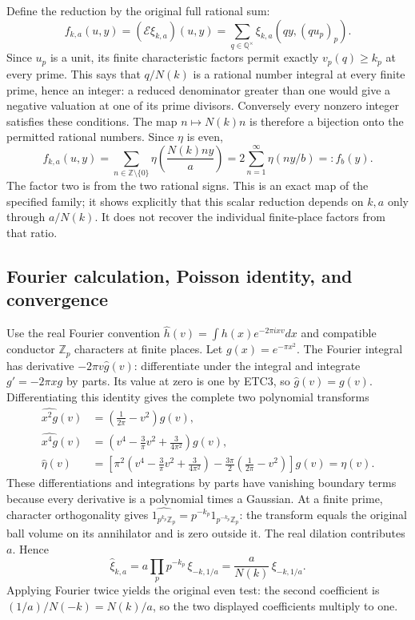 \documentclass[11pt]{article}
\begin{document}
Define the reduction by the original full rational sum:
\begin{equation}\tag{ETC5}
 f_{k,a}(u,y)=(\mathcal E\xi_{k,a})(u,y)
 =\sum_{q\in\mathbb Q^\times}\xi_{k,a}(qy,(qu_p)_p).
\end{equation}
Since $u_p$ is a unit, its finite characteristic factors permit exactly
$v_p(q)\ge k_p$ at every prime. This says that $q/N(k)$ is a rational
number integral at every finite prime, hence an integer: a reduced
denominator greater than one would give a negative valuation at one
of its prime divisors. Conversely every nonzero integer satisfies
these conditions. The map $n\mapsto N(k)n$ is therefore a bijection
onto the permitted rational numbers. Since $\eta$ is even,
\begin{equation}\tag{ETC6}
 f_{k,a}(u,y)=\sum_{n\in\mathbb Z\setminus\{0\}}
             \eta\left(\frac{N(k)ny}{a}\right)
 =2\sum_{n=1}^{\infty}\eta(ny/b)=:f_b(y).
\end{equation}
The factor two is from the two rational signs. This is an exact map
of the specified family; it shows explicitly that this scalar
reduction depends on $k,a$ only through $a/N(k)$. It does not recover
the individual finite-place factors from that ratio.

\subsection{Fourier calculation, Poisson identity, and convergence}

Use the real Fourier convention
$\widehat h(v)=\int h(x)e^{-2\pi ixv}dx$ and compatible conductor
$\mathbb Z_p$ characters at finite places. Let $g(x)=e^{-\pi x^2}$.
The Fourier integral has derivative $-2\pi v\widehat g(v)$:
differentiate under the integral and integrate $g'=-2\pi xg$ by
parts. Its value at zero is one by ETC3, so $\widehat g(v)=g(v)$.
Differentiating this identity gives the complete two polynomial
transforms
\begin{equation}\tag{ETC7}
 \begin{split}
 \widehat{x^2g}(v)&=\left(\frac1{2\pi}-v^2\right)g(v),\\
 \widehat{x^4g}(v)&=
       \left(v^4-\frac3\pi v^2+\frac3{4\pi^2}\right)g(v),\\
 \widehat\eta(v)&=\left[
 \pi^2\left(v^4-\frac3\pi v^2+\frac3{4\pi^2}\right)
 -\frac{3\pi}{2}\left(\frac1{2\pi}-v^2\right)\right]g(v)
 =\eta(v).
 \end{split}
\end{equation}
These differentiations and integrations by parts have vanishing
boundary terms because every derivative is a polynomial times a
Gaussian. At a finite prime, character orthogonality gives
$\widehat{1_{p^{k_p}\mathbb Z_p}}
 =p^{-k_p}1_{p^{-k_p}\mathbb Z_p}$: the transform equals the
original ball volume on its annihilator and is zero outside it.
The real dilation contributes $a$. Hence
\begin{equation}\tag{ETC8}
 \widehat\xi_{k,a}
 =a\prod_pp^{-k_p}\,\xi_{-k,1/a}
 =\frac a{N(k)}\,\xi_{-k,1/a}.
\end{equation}
Applying Fourier twice yields the original even test: the second
coefficient is $(1/a)/N(-k)=N(k)/a$, so the two displayed coefficients
multiply to one.
\end{document}
